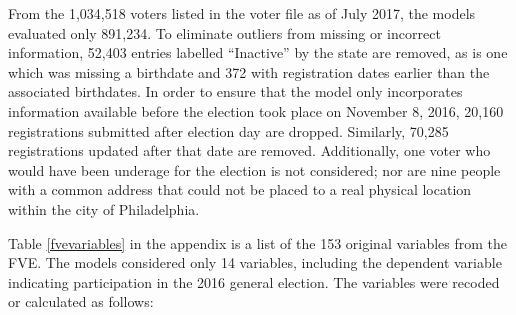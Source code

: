 \documentclass[12pt]{article}
\begin{document}
From the 1,034,518 voters listed in the voter file as of July 2017, the models evaluated only 891,234. To eliminate outliers from missing or incorrect information, 52,403 entries labelled ``Inactive'' by the state are removed, as is one which was missing a birthdate and 372 with registration dates earlier than the associated birthdates. In order to ensure that the model only incorporates information available before the election took place on November 8, 2016, 20,160 registrations submitted after election day are dropped. Similarly, 70,285 registrations updated after that date are removed. Additionally, one voter who would have been underage for the election is not considered; nor are nine people with a common address that could not be placed to a real physical location within the city of Philadelphia.

Table \ref{fvevariables} in the appendix is a list of the 153 original variables from the FVE. The models considered only 14 variables, including the dependent variable indicating participation in the 2016 general election. The variables were recoded or calculated as follows:
\end{document}
